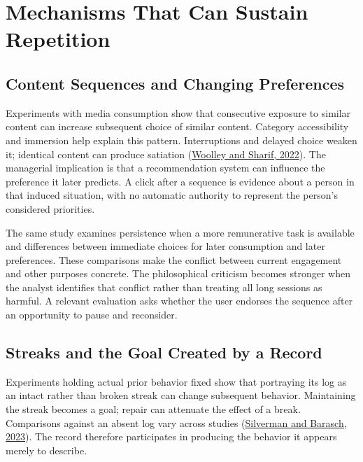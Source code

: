 
\hypertarget{M09-mechanisms-that-can-sustain-repetition}{%
\section{Mechanisms That Can Sustain
Repetition}\label{M09-mechanisms-that-can-sustain-repetition}}

\noindent \hypertarget{M09-content-sequences-and-changing-preferences}{%
\subsection{Content Sequences and Changing
Preferences}\label{M09-content-sequences-and-changing-preferences}}

\noindent \noindent Experiments with media consumption show that consecutive
exposure to similar content can increase subsequent choice of similar
content. Category accessibility and immersion help explain this pattern.
Interruptions and delayed choice weaken it; identical content can
produce satiation
(\href{https://doi.org/10.1177/00222437211055403}{Woolley and Sharif,
2022}). The managerial implication is that a recommendation system can
influence the preference it later predicts. A click after a sequence is
evidence about a person in that induced situation, with no automatic
authority to represent the person's considered priorities.

The same study examines persistence when a more remunerative task is
available and differences between immediate choices for later
consumption and later preferences. These comparisons make the conflict
between current engagement and other purposes concrete. The
philosophical criticism becomes stronger when the analyst identifies
that conflict rather than treating all long sessions as harmful. A
relevant evaluation asks whether the user endorses the sequence after an
opportunity to pause and reconsider.

\hypertarget{M09-streaks-and-the-goal-created-by-a-record}{%
\subsection{Streaks and the Goal Created by a
Record}\label{M09-streaks-and-the-goal-created-by-a-record}}

\noindent \noindent Experiments holding actual prior behavior fixed show that
portraying its log as an intact rather than broken streak can change
subsequent behavior. Maintaining the streak becomes a goal; repair can
attenuate the effect of a break. Comparisons against an absent log vary
across studies (\href{https://doi.org/10.1093/jcr/ucac029}{Silverman and
Barasch, 2023}). The record therefore participates in producing the
behavior it appears merely to describe.

